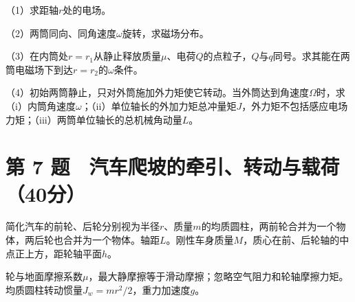 \documentclass[12pt,a4paper,fontset=fandol]{ctexart}
\begin{document}
\begin{center}
\begin{minipage}{\linewidth}
\centering\begingroup{}
\ifdim\wd\diagrambox>.88\linewidth
\sbox{\diagrambox}{\resizebox{.88\linewidth}{!}{\usebox{\diagrambox}}}\fi
\ifdim\ht\diagrambox>.20\textheight
\resizebox{!}{.20\textheight}{\usebox{\diagrambox}}
\else\usebox{\diagrambox}\fi
\par{}\endgroup\end{minipage}\end{center}

（1）求距轴\(r\)处的电场。

（2）两筒同向、同角速度\(\omega\)旋转，求磁场分布。

（3）在内筒处\(r=r_1\)从静止释放质量\(\mu\)、电荷\(Q\)的点粒子，\(Q\)与\(q\)同号。求其能在两筒电磁场下到达\(r=r_2\)的\(\omega\)条件。

（4）初始两筒静止，只对外筒施加外力矩使它转动。当外筒达到角速度\(\Omega\)时，求（i）内筒角速度\(\omega\)；（ii）单位轴长的外加力矩总冲量矩\(J\)，外力矩不包括感应电场力矩；（iii）两筒单位轴长的总机械角动量\(L\)。

\clearpage

\section{第 7
题　汽车爬坡的牵引、转动与载荷（40分）}\label{ux7b2c-7-ux9898-ux6c7dux8f66ux722cux5761ux7684ux7275ux5f15ux8f6cux52a8ux4e0eux8f7dux837740ux5206}

简化汽车的前轮、后轮分别视为半径\(r\)、质量\(m\)的均质圆柱，两前轮合并为一个物体，两后轮也合并为一个物体。轴距\(L\)。刚性车身质量\(M\)，质心在前、后轮轴的中点正上方，距轮轴平面\(h\)。

轮与地面摩擦系数\(\mu\)，最大静摩擦等于滑动摩擦；忽略空气阻力和轮轴摩擦力矩。均质圆柱转动惯量\(J_w=mr^2/2\)，重力加速度\(g\)。
\end{document}
